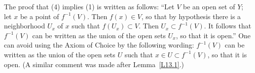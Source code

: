 \documentclass[12pt,letterpaper]{article}
\begin{document}
The proof that (4) implies (1) is written as follows: ``Let $V$ be an open set of $Y$; let $x$ be a point of $f^{-1}(V)$. Then $f(x) \in V$, so that by hypothesis there is a neighborhood $U_x$ of $x$ such that $f(U_x) \subset V$. Then $U_x \subset f^{-1}(V)$. It follows that $f^{-1}(V)$ can be written as the union of the open sets $U_x$, so that it is open.'' One can avoid using the Axiom of Choice by the following wording: $f^{-1}(V)$ can be written as the union of the open sets $U$ such that $x\in U\subset f^{-1}(V)$, so that it is open. (A similar comment was made after Lemma~\ref{L13.1}.) 
\end{document}
